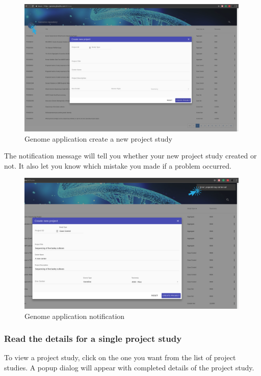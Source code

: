\documentclass[a4paper,12pt]{article}
\begin{document}
\begin{figure}[H]
\centering
\includegraphics[width=0.99\textwidth]{images/genome-create}
\caption{Genome application create a new project study}
\end{figure}

The notification message will tell you whether your new project study created or not. It also let you know which mistake you made if a problem occurred.

\begin{figure}[H]
\centering
\includegraphics[width=0.99\textwidth]{images/genome-create-notification}
\caption{Genome application notification}
\end{figure}

\subsubsection{Read the details for a single project study}
To view a project study, click on the one you want from the list of project studies. A popup dialog will appear with completed details of the project study.
\end{document}
